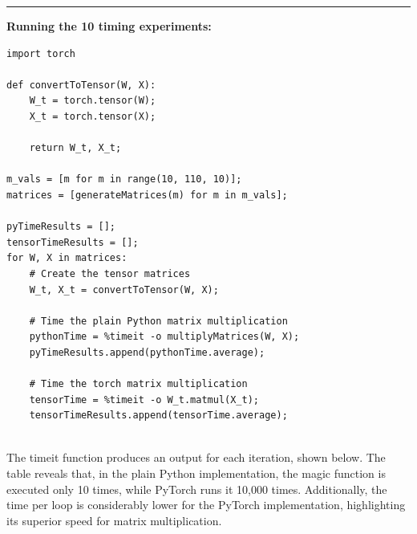 \documentclass[12pt]{article}
\begin{document}
\noindent\rule{\textwidth}{0.4pt}
\noindent\textbf{Running the 10 timing experiments:}
\begin{lstlisting}
import torch

def convertToTensor(W, X):
    W_t = torch.tensor(W);
    X_t = torch.tensor(X);

    return W_t, X_t;

m_vals = [m for m in range(10, 110, 10)];
matrices = [generateMatrices(m) for m in m_vals];

pyTimeResults = [];
tensorTimeResults = [];
for W, X in matrices:
    # Create the tensor matrices
    W_t, X_t = convertToTensor(W, X);

    # Time the plain Python matrix multiplication
    pythonTime = %timeit -o multiplyMatrices(W, X);
    pyTimeResults.append(pythonTime.average);

    # Time the torch matrix multiplication
    tensorTime = %timeit -o W_t.matmul(X_t);
    tensorTimeResults.append(tensorTime.average);
\end{lstlisting}

\noindent \\

\noindent The timeit function produces an output for each iteration, shown below.
The table reveals that, in the plain Python implementation, the magic function is executed only 10 times, while PyTorch runs it 10,000 times.
Additionally, the time per loop is considerably lower for the PyTorch implementation, highlighting its superior speed for matrix multiplication.
\end{document}
